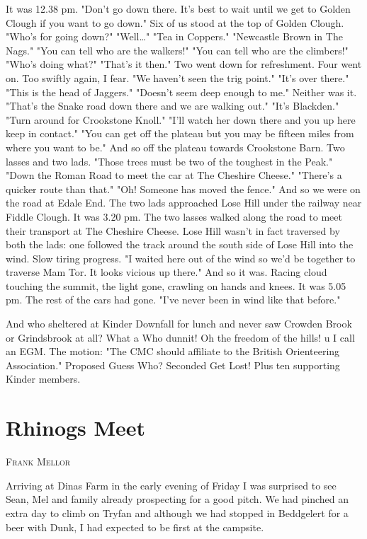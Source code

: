 \documentclass[a5paper,openany,font 10pt]{scrbook}
\makeatletter
\newcommand{\chapterauthor}[1]{%
{\parindent0pt\vspace*{-5pt}%
\linespread{1.1}\large\scshape#1%
\par\nobreak\vspace*{35pt}}
\@afterheading%
}
\makeatother
\begin{document}
It was 12.38 pm.
    "Don't go down there. It's best to wait until we get to
Golden Clough if you want to go down."
Six of us stood at the top of Golden Clough.
    "Who's for going down?"
    "Well\ldots{}"
    "Tea in Coppers."
    "Newcastle Brown in The Nags."
    "You can tell who are the walkers!"
    "You can tell who are the climbers!"
    "Who's doing what?"   "That's it then."
Two went down for refreshment. Four went on. Too swiftly again, I
fear.
    "We haven't seen the trig point."
    "It's over there."
    "This is the head of Jaggers."
    "Doesn't seem deep enough to me."
Neither was it.
    "That's the Snake road down there and we are walking
out."
    "It's Blackden."
    "Turn around for Crookstone Knoll."
    "I'll watch her down there and you up here   keep in
contact."
    "You can get off the plateau but you may be fifteen
miles from where you want to be."
And so off the plateau towards Crookstone Barn. Two lasses and
two lads.
    "Those trees must be two of the toughest in the Peak."
    "Down the Roman Road to meet the car at The Cheshire
Cheese."
    "There's a quicker route than that."
    "Oh! Someone has moved the fence."
And so we were on the road at Edale End. The two lads approached
Lose Hill under the railway near Fiddle Clough. It was 3.20 pm.
The two lasses walked along the road to meet their transport at
The Cheshire Cheese.
Lose Hill wasn't in fact traversed by both the lads: one
followed the track around the south side of Lose Hill into the
wind. Slow tiring progress.
    "I waited here out of the wind so we'd be together to
traverse Mam Tor. It looks vicious up there."
And so it was. Racing cloud touching the summit, the light
gone, crawling on hands and knees. It was 5.05 pm. The rest of
the cars had gone.
    "I've never been in wind like that before."

And who sheltered at Kinder Downfall for lunch and never saw
Crowden Brook or Grindsbrook at all? What a Who dunnit! Oh the
freedom of the hills! u  I call an EGM. The motion:
"The CMC should affiliate to the British Orienteering
Association."
Proposed   Guess Who?
Seconded   Get Lost! Plus ten supporting Kinder members.

\chapter{Rhinogs Meet}
\label{sec:orgdbda051}
\chapterauthor{Frank Mellor}

Arriving at Dinas Farm in the early evening of Friday I was
surprised to see Sean, Mel and family already prospecting for a
good pitch. We had pinched an extra day to climb on Tryfan and
although we had stopped in Beddgelert for a beer with Dunk, I had
expected to be first at the campsite.
\end{document}
